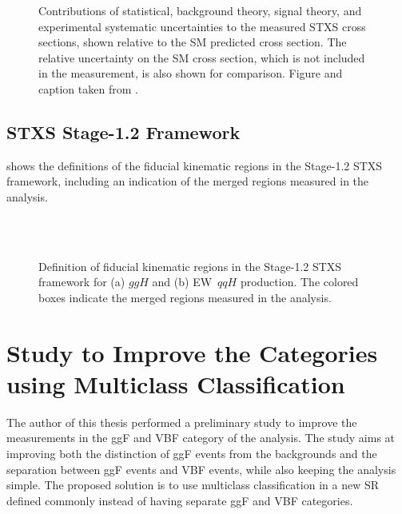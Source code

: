     \begin{figure}[h]
        \centering
        \caption{Contributions of statistical, background theory, signal theory, and experimental systematic uncertainties to the measured STXS cross sections, shown relative to the SM predicted cross section. The relative uncertainty on the SM cross section, which is not included in the measurement, is also shown for comparison.
        Figure and caption taken from .
        }
        \label{fig:stxs:uncertainty-breakdown}
    \end{figure}

    \clearpage
    \FloatBarrier
    \section{STXS Stage-1.2 Framework}
    \label{app:stxs-measurements-aux}

     shows the definitions of the fiducial kinematic regions in the Stage-1.2 STXS framework, including an indication of the merged regions measured in the \HWW analysis.

    \begin{figure}[h]
        \centering
         \\
         \\
        \caption{Definition of fiducial kinematic regions in the Stage-1.2 STXS framework for (a) $ggH$ and (b) EW~$qqH$ production. The colored boxes indicate the merged regions measured in the \HWW analysis.}
        \label{fig:stxs:stage-12-definition}
    \end{figure}


    \chapter{Study to Improve the \TwoJet Categories using Multiclass Classification}
    \label{app:multi-class-2jet-strategy}
    The author of this thesis performed a preliminary study to improve the measurements in the ggF \TwoJet and VBF \TwoJet category of the \HWW analysis.
    The study aims at improving both the distinction of ggF \TwoJet events from the backgrounds and the separation between ggF \TwoJet events and VBF \TwoJet events, while also keeping the analysis simple.
    The proposed solution is to use multiclass classification in a new \TwoJet SR defined commonly instead of having separate ggF \TwoJet and VBF \TwoJet categories.

